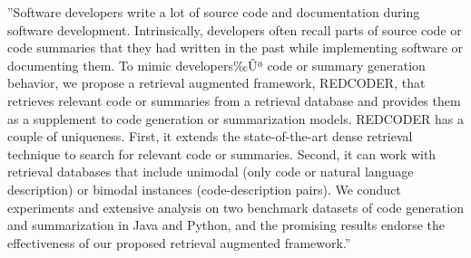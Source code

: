 ''Software developers write a lot of source code and documentation during software development. Intrinsically, developers often recall parts of source code or code summaries that they had written in the past while implementing software or documenting them. To mimic developers‰Ûª code or summary generation behavior, we propose a retrieval augmented framework, REDCODER, that retrieves relevant code or summaries from a retrieval database and provides them as a supplement to code generation or summarization models. REDCODER has a couple of uniqueness. First, it extends the state-of-the-art dense retrieval technique to search for relevant code or summaries. Second, it can work with retrieval databases that include unimodal (only code or natural language description) or bimodal instances (code-description pairs). We conduct experiments and extensive analysis on two benchmark datasets of code generation and summarization in Java and Python, and the promising results endorse the effectiveness of our proposed retrieval augmented framework.''
